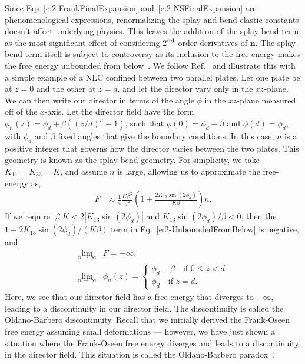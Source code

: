 Since Eqs~\ref{e:2-FrankFinalExpansion} and~\ref{e:2-NSFinalExpansion} are phenomenological expressions, renormalizing the splay and bend elastic constants doesn't affect underlying physics.
This leaves the addition of the splay-bend term as the most significant effect of considering 2$^\textup{\rm nd}$ order derivatives of $\mathbf{n}$.
The splay-bend term itself is subject to controversy as its inclusion to the free energy makes the free energy unbounded from below~\cite{RN214,RN215,RN216}.
We follow Ref.~\cite{RN219} and illustrate this with a simple example of a NLC confined between two parallel plates.
Let one plate be at $z = 0$ and the other at $z=d$, and let the director vary only in the $xz$-plane.
We can then write our director in terms of the angle $\phi$ in the $xz$-plane measured off of the $x$-axis.
Let the director field have the form $\phi_n(z) = \phi_d + \beta ((z/d)^n-1)$, such that $\phi(0) = \phi_d - \beta$ and $\phi(d) = \phi_d$, with $\phi_d$ and $\beta$ fixed angles that give the boundary conditions.
In this case, $n$ is a positive integer that governs how the director varies between the two plates.
This geometry is known as the splay-bend geometry.
For simplicity, we take $K_{11} = K_{33} = K$, and assume $n$ is large, allowing us to approximate the free-energy as,
\begin{align}
  F &\approx \frac{1}{4}\frac{K \beta^2}{d^2} \left ( 1 + \frac{2 K_{13} \sin(2 \phi_d)}{K \beta}  \right) n.\label{e:2-UnboundedFromBelow}
\end{align}
If we require $|\beta|K < 2| K_{13} \sin(2 \phi_d)| $ and $K_{13} \sin(2 \phi_d)/\beta < 0$, then the \\ $1 + 2 K_{13} \sin(2 \phi_d)/(K \beta) $ term in Eq.~\ref{e:2-UnboundedFromBelow} is negative, and
\begin{align}
  \lim_{n\to\infty} &F = -\infty, \\
  \lim_{n\to\infty} &\phi_n(z) =
  \begin{cases}
    \phi_d - \beta \quad \textrm{if }  0 \leq z  < d \\
    \phi_d \quad \textrm{if } z = d.
  \end{cases}
\end{align}
Here, we see that our director field has a free energy that diverges to $- \infty$, leading to a discontinuity in our director field.
The discontinuity is called the Oldano-Barbero discontinuity.
Recall that we initially derived the Frank-Oseen free energy assuming small deformations --- however, we have just shown a situation where the Frank-Oseen free energy diverges and leads to a discontinuity in the director field.
This situation is called the Oldano-Barbero paradox~\cite{RN216,RN220,RN219,RN221}.

